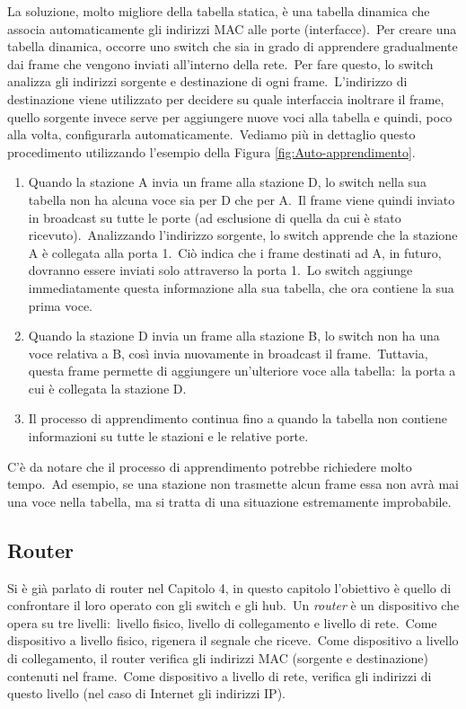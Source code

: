 La soluzione, molto migliore della tabella statica, è una tabella dinamica che associa automaticamente gli indirizzi MAC alle porte (interfacce).\
Per creare una tabella dinamica, occorre uno switch che sia in grado di apprendere gradualmente dai frame che vengono inviati all'interno della rete.\
Per fare questo, lo switch analizza gli indirizzi sorgente e destinazione di ogni frame.\
L'indirizzo di destinazione viene utilizzato per decidere su quale interfaccia inoltrare il frame, quello sorgente invece serve per aggiungere nuove voci alla tabella e quindi, poco alla volta, configurarla automaticamente.\
Vediamo più in dettaglio questo procedimento utilizzando l'esempio della Figura \ref{fig:Auto-apprendimento}.

\begin{enumerate}
    \item Quando la stazione A invia un frame alla stazione D, lo switch nella sua tabella non ha alcuna voce sia per D che per A.\
          Il frame viene quindi inviato in broadcast su tutte le porte (ad esclusione di quella da cui è stato ricevuto).\
          Analizzando l'indirizzo sorgente, lo switch apprende che la stazione A è collegata alla porta 1.\
          Ciò indica che i frame destinati ad A, in futuro, dovranno essere inviati solo attraverso la porta 1.\
          Lo switch aggiunge immediatamente questa informazione alla sua tabella, che ora contiene la sua prima voce.
    \item Quando la stazione D invia un frame alla stazione B, lo switch non ha una voce relativa a B, così invia nuovamente in broadcast il frame.\
          Tuttavia, questa frame permette di aggiungere un'ulteriore voce alla tabella:\ la porta a cui è collegata la stazione D.
    \item Il processo di apprendimento continua fino a quando la tabella non contiene informazioni su tutte le stazioni e le relative porte.
\end{enumerate}
C'è da notare che il processo di apprendimento potrebbe richiedere molto tempo.\
Ad esempio, se una stazione non trasmette alcun frame essa non avrà mai una voce nella tabella, ma si tratta di una situazione estremamente improbabile.

\subsection{Router}

Si è già parlato di router nel Capitolo 4, in questo capitolo l'obiettivo è quello di confrontare il loro operato con gli switch e gli hub.\
Un \emph{router} è un dispositivo che opera su tre livelli:\ livello fisico, livello di collegamento e livello di rete.\
Come dispositivo a livello fisico, rigenera il segnale che riceve.\
Come dispositivo a livello di collegamento, il router verifica gli indirizzi MAC (sorgente e destinazione) contenuti nel frame.\
Come dispositivo a livello di rete, verifica gli indirizzi di questo livello (nel caso di Internet gli indirizzi IP).

